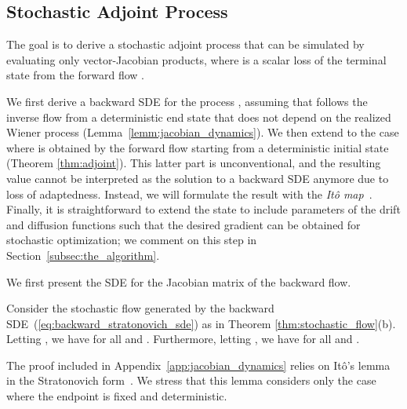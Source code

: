 \documentclass[twoside]{article}
\begin{document}
\subsection{Stochastic Adjoint Process}
The goal is to derive a stochastic adjoint process  that can be simulated by evaluating only vector-Jacobian products, where  is a scalar loss of the terminal state from the forward flow .

We first derive a backward SDE for the process , assuming that  follows the inverse flow from a deterministic end state  that does not depend on the realized Wiener process (Lemma~\ref{lemm:jacobian_dynamics}). 
We then extend to the case where  is obtained by the forward flow starting from a deterministic initial state  (Theorem \ref{thm:adjoint}).
This latter part is unconventional, and the resulting value cannot be interpreted as the solution to a backward SDE anymore due to loss of adaptedness. 
Instead, we will formulate the result with the \textit{It\^o map}~\cite{rogers2000diffusions2}. 
Finally, it is straightforward to extend the state  to include parameters of the drift and diffusion functions such that the desired gradient can be obtained for stochastic optimization; we comment on this step in Section~\ref{subsec:the_algorithm}.




We first present the SDE for the Jacobian matrix of the backward flow.

\begin{lemm}[Dynamics of ] \label{lemm:jacobian_dynamics}
Consider the stochastic flow generated by the backward SDE~(\ref{eq:backward_stratonovich_sde}) as in Theorem \ref{thm:stochastic_flow}(b). Letting , we have
for all  and .
Furthermore, letting , we have
for all  and .
\end{lemm}
The proof included in Appendix~\ref{app:jacobian_dynamics} relies on It\^o's lemma in the Stratonovich form~\cite[Theorem 2.4.1]{kunita2019stochastic}.
We stress that this lemma considers only the case where the endpoint  is fixed and deterministic.
\end{document}
